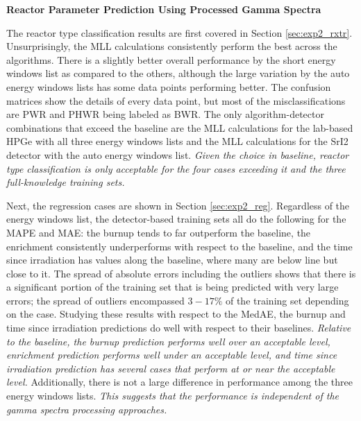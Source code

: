 \noindent \textbf{Reactor Parameter Prediction Using Processed Gamma Spectra}


The reactor type classification results are first covered in Section
\ref{sec:exp2_rxtr}.  Unsurprisingly, the \gls{MLL} calculations consistently
perform the best across the algorithms. There is a slightly better overall
performance by the short energy windows list as compared to the others,
although the large variation by the auto energy windows lists has some data
points performing better.  The confusion matrices show the details of every
data point, but most of the misclassifications are \gls{PWR} and \gls{PHWR}
being labeled as \gls{BWR}.  The only algorithm-detector combinations that
exceed the baseline are the \gls{MLL} calculations for the lab-based \gls{HPGe}
with all three energy windows lists and the \gls{MLL} calculations for the
\gls{SrI2} detector with the auto energy windows list. \textit{Given the choice
in baseline, reactor type classification is only acceptable for the four cases
exceeding it and the three full-knowledge training sets.}

Next, the regression cases are shown in Section \ref{sec:exp2_reg}.  Regardless
of the energy windows list, the detector-based training sets all do the
following for the \gls{MAPE} and \gls{MAE}: the burnup tends to far outperform
the baseline, the enrichment consistently underperforms with respect to the
baseline, and the time since irradiation has values along the baseline, where
many are below line but close to it.  The spread of absolute errors including
the outliers shows that there is a significant portion of the training set that
is being predicted with very large errors; the spread of outliers encompassed
$3-17\%$ of the training set depending on the case.  Studying these results
with respect to the \gls{MedAE}, the burnup and time since irradiation
predictions do well with respect to their baselines.  \textit{Relative to the
baseline, the burnup prediction performs well over an acceptable level,
enrichment prediction performs well under an acceptable level, and time since
irradiation prediction has several cases that perform at or near the acceptable
level.} Additionally, there is not a large difference in performance among the
three energy windows lists.  \textit{This suggests that the performance is
independent of the gamma spectra processing approaches.} 

